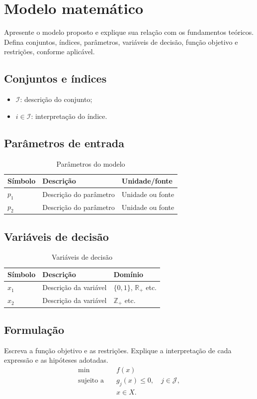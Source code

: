 \documentclass[12pt,a4paper]{article}
\begin{document}
\section{Modelo matemático}
Apresente o modelo proposto e explique sua relação com os fundamentos teóricos. Defina conjuntos, índices, parâmetros, variáveis de decisão, função objetivo e restrições, conforme aplicável.

\subsection{Conjuntos e índices}
\begin{itemize}[leftmargin=*]
    \item $\mathcal{I}$: descrição do conjunto;
    \item $i \in \mathcal{I}$: interpretação do índice.
\end{itemize}

\subsection{Parâmetros de entrada}
\begin{table}[H]
\centering
\caption{Parâmetros do modelo}
\begin{tabular}{lll}
\toprule
Símbolo & Descrição & Unidade/fonte\\
\midrule
$p_1$ & Descrição do parâmetro & Unidade ou fonte\\
$p_2$ & Descrição do parâmetro & Unidade ou fonte\\
\bottomrule
\end{tabular}
\end{table}

\subsection{Variáveis de decisão}
\begin{table}[H]
\centering
\caption{Variáveis de decisão}
\begin{tabular}{lll}
\toprule
Símbolo & Descrição & Domínio\\
\midrule
$x_1$ & Descrição da variável & $\{0,1\}$, $\mathbb{R}_+$ etc.\\
$x_2$ & Descrição da variável & $\mathbb{Z}_+$ etc.\\
\bottomrule
\end{tabular}
\end{table}

\subsection{Formulação}
Escreva a função objetivo e as restrições. Explique a interpretação de cada expressão e as hipóteses adotadas.
\begin{align}
\min \quad & f(x) \label{eq:objetivo}\\
\text{sujeito a} \quad & g_j(x) \leq 0, \quad j \in \mathcal{J}, \label{eq:restricao}\\
& x \in X. \nonumber
\end{align}
\end{document}
